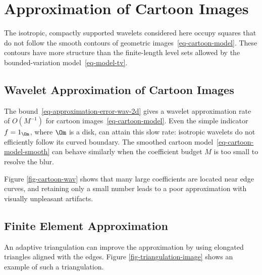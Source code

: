 \section{Approximation of Cartoon Images}

The isotropic, compactly supported wavelets considered here occupy squares that do not follow the smooth contours of geometric images~\eqref{eq-cartoon-model}. These contours have more structure than the finite-length level sets allowed by the bounded-variation model~\eqref{eq-model-tv}.

                                        
\subsection{Wavelet Approximation of Cartoon Images}

The bound~\eqref{eq-approximation-error-wav-2d} gives a wavelet approximation rate of $O(M^{-1})$ for cartoon images~\eqref{eq-cartoon-model}. Even the simple indicator $f=1_\Om$, where $\Om$ is a disk, can attain this slow rate: isotropic wavelets do not efficiently follow its curved boundary. The smoothed cartoon model~\eqref{eq-cartoon-model-smooth} can behave similarly when the coefficient budget $M$ is too small to resolve the blur.

Figure \ref{fig-cartoon-wav} shows that many large coefficients are located near edge curves, and retaining only a small number leads to a poor approximation with visually unpleasant artifacts.



                                        
\subsection{Finite Element Approximation}

An adaptive triangulation can improve the approximation by using elongated triangles aligned with the edges.
Figure \ref{fig-triangulation-image} shows an example of such a triangulation.


